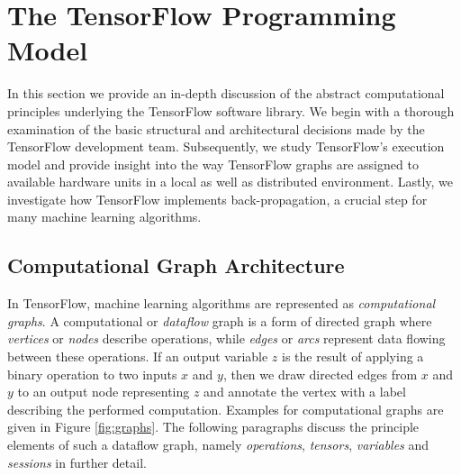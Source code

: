 \section{The TensorFlow Programming Model}\label{sec:model}

In this section we provide an in-depth discussion of the abstract computational
principles underlying the TensorFlow software library. We begin with a thorough
examination of the basic structural and architectural decisions made by the
TensorFlow development team. Subsequently, we study TensorFlow's execution model
and provide insight into the way TensorFlow graphs are assigned to available
hardware units in a local as well as distributed environment. Lastly, we
investigate how TensorFlow implements back-propagation, a crucial step for many
machine learning algorithms.

\subsection{Computational Graph Architecture}\label{sec:model-graphs}

In TensorFlow, machine learning algorithms are represented as
\emph{computational graphs}. A computational or \emph{dataflow} graph is a form
of directed graph where \emph{vertices} or \emph{nodes} describe operations,
while \emph{edges} or \emph{arcs} represent data flowing between these
operations. If an output variable $z$ is the result of applying a binary
operation to two inputs $x$ and $y$, then we draw directed edges from $x$ and
$y$ to an output node representing $z$ and annotate the vertex with a label
describing the performed computation. Examples for computational graphs are
given in Figure \ref{fig:graphs}. The following paragraphs discuss the principle
elements of such a dataflow graph, namely \emph{operations}, \emph{tensors},
\emph{variables} and \emph{sessions} in further detail.

